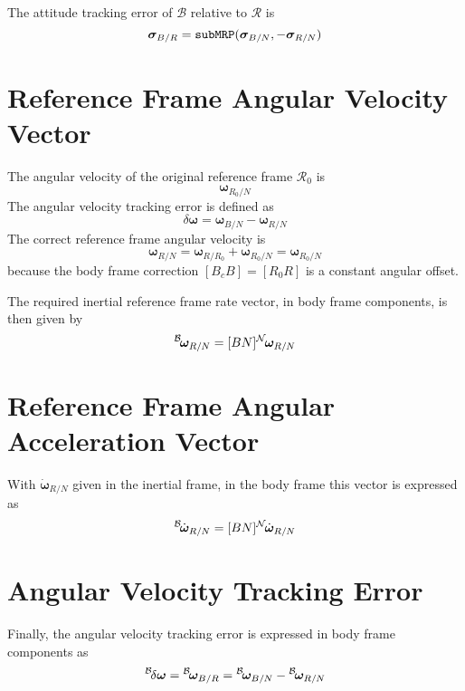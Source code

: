 \documentclass[]{AVSSimReportMemo}
\begin{document}
The attitude tracking error of $\mathcal{B}$ relative to $\mathcal{R}$ is
$$
	\bm\sigma_{B/R} = {\tt subMRP}(\bm\sigma_{B/N}, -\bm\sigma_{R/N})
$$




\section{Reference Frame Angular Velocity Vector}
The angular velocity of the original reference frame $\mathcal{R}_{0}$ is
\begin{equation}
	\bm\omega_{R_{0}/N}
\end{equation}
The angular velocity tracking error is defined as
\begin{equation}
	\delta\bm\omega = \bm\omega_{B/N} - \bm\omega_{R/N}
\end{equation}
The correct reference frame angular velocity is
\begin{equation}
	\bm\omega_{R/N} = \bm\omega_{R/R_{0}} + \bm\omega_{R_{0}/N} =  \bm\omega_{R_{0}/N} 
\end{equation}
because the body frame correction $[B_{c} B] = [R_{0}R]$ is a constant angular offset.  

The required inertial reference frame rate vector, in body frame components, is then given by
\begin{equation}
	\leftexp{B}{\bm\omega}_{R/N} = [BN] \leftexp{N}{\bm\omega}_{R/N}
\end{equation}


\section{Reference Frame Angular Acceleration Vector}
With $\dot{\bm \omega}_{R/N}$ given in the inertial frame, in the body frame this vector is expressed as
\begin{equation}
	\leftexp{B}{\dot{\bm\omega}}_{R/N} = [BN] \leftexp{N}{\dot{\bm\omega}}_{R/N}
\end{equation}


\section{Angular Velocity Tracking Error}
Finally, the angular velocity tracking error is expressed in body frame components as
\begin{equation}
	\leftexp{B}{\delta\bm\omega} = \leftexp{B}{\bm\omega_{B/R}} = \leftexp{B}{\bm\omega}_{B/N} - \leftexp{B}{\bm\omega}_{R/N}
\end{equation}






\end{document}
